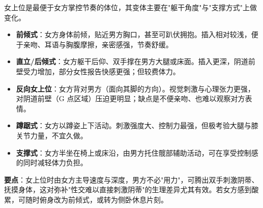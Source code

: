 女上位是最便于女方掌控节奏的体位，其变体主要在"躯干角度"与"支撑方式"上做变化。

\begin{itemize}
	\item \textbf{前倾式}：女方身体前倾，贴近男方胸口，甚至可趴伏拥抱。插入相对较浅，便于亲吻、耳语与胸腹摩擦，亲密感强，节奏舒缓。
	\item \textbf{直立/后倾式}：女方躯干后仰、双手撑在男方大腿或床面。插入更深，阴道前壁受力增加，部分女性报告快感更强；但较费体力。
	\item \textbf{反向女上位}：女方背对男方（面向其脚的方向）。视觉刺激与心理张力更强，对阴道前壁（G 点区域）压迫更明显；缺点是不便亲吻、也难以观察对方表情。
	\item \textbf{蹲踞式}：女方以蹲姿上下活动。刺激强度大、控制力最强，但极考验大腿与膝关节力量，不宜久做。
	\item \textbf{支撑式}：女方半坐在椅上或床沿，由男方托住髋部辅助活动，可在享受控制感的同时减轻体力负担。
\end{itemize}

\noindent\textbf{要点}：女上位时由女方主导速度与深度，男方不必"用力"，可腾出双手刺激阴蒂、抚摸身体，这对弥补"性交难以直接刺激阴蒂"的生理差异尤其有效。若女方感到酸累，可随时俯身改为前倾式，或转为侧卧休息片刻。
